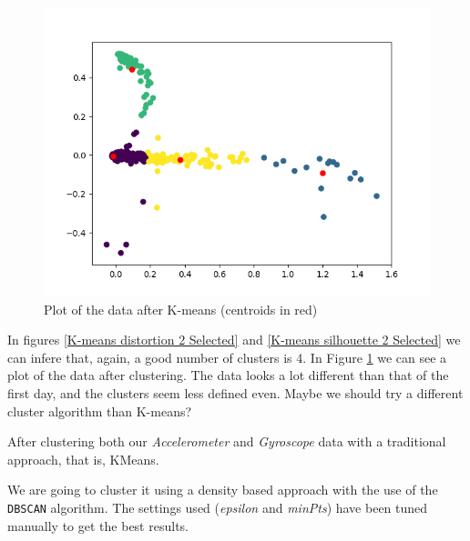 \documentclass[idxtotoc,hyperref,openany]{labbook} %
\begin{document}
\begin{figure}[h]
\includegraphics[width=0.9\linewidth]{KMeans_Plot_Accelerometer_Day2_Selected.png}
\setlength\belowcaptionskip{-10pt}
\caption{Plot of the data after K-means (centroids in red)}
\label{K-Means plot 2 Selected}
\end{figure}

In figures \ref{K-means distortion 2 Selected} and \ref{K-means silhouette 2 Selected} we can infere that, again, a good number of clusters is 4. In Figure \ref{K-Means plot 2 Selected} we can see a plot of the data after clustering. The data looks a lot different than that of the first day, and the clusters seem less defined even. Maybe we should try a different cluster algorithm than K-means?



After clustering both our \textit{Accelerometer} and \textit{Gyroscope} data with a traditional approach, that is, KMeans.

We are going to cluster it using a density based approach with the use of the \texttt{DBSCAN} algorithm. The settings used (\textit{epsilon} and \textit{minPts}) have been tuned manually to get the best results.
\end{document}
